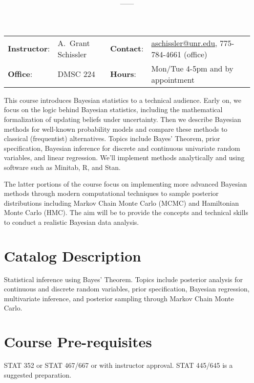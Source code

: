 \documentclass[11pt,onecolumn]{article}
\title{\textbf{\coursename}}
\author{{\semester}---{\roomnumb}---{\classtimes}}
\date{}
\makeatletter
\newcommand{\myname}{A.~Grant Schissler}
\newcommand{\myemail}{aschissler@unr.edu}
\newcommand{\office}{DMSC 224}
\newcommand{\officehours}{Mon/Tue 4-5pm and by appointment}
\makeatother
\begin{document}
\maketitle

\vspace{-0.25in}
\noindent\makebox[\linewidth]{\rule{\textwidth}{1pt}}

\begin{center}
\begin{tabular}{llll}
\textbf{Instructor}:&\myname & \textbf{Contact}:&\href{mailto:\myemail}{\myemail}, 775-784-4661 (office)\\
\textbf{Office}:&\office & \textbf{Hours}:&\officehours\\
\end{tabular}
\end{center}

\noindent This course introduces Bayesian statistics to a technical audience. Early on, we focus on the logic behind Bayesian statistics, including the mathematical formalization of updating beliefs under uncertainty. Then we describe Bayesian methods for well-known probability models and compare these methods to classical (frequentist) alternatives. Topics include Bayes' Theorem, prior specification, Bayesian inference for discrete and continuous univariate random variables, and linear regression. We'll implement methods analytically and using software such as Minitab, R, and Stan.

The latter portions of the course focus on implementing more advanced Bayesian methods through modern computational techniques to sample posterior distributions including Markov Chain Monte Carlo (MCMC) and Hamiltonian Monte Carlo (HMC). The aim will be to provide the concepts and technical skills to conduct a realistic Bayesian data analysis. 

\section*{Catalog Description}
Statistical inference using Bayes' Theorem. Topics include posterior analysis for continuous and discrete random variables, prior specification, Bayesian regression, multivariate inference, and posterior sampling through Markov Chain Monte Carlo.

\section*{Course Pre-requisites}
STAT 352 or STAT 467/667 or with instructor approval. STAT 445/645 is a suggested preparation.
\end{document}
